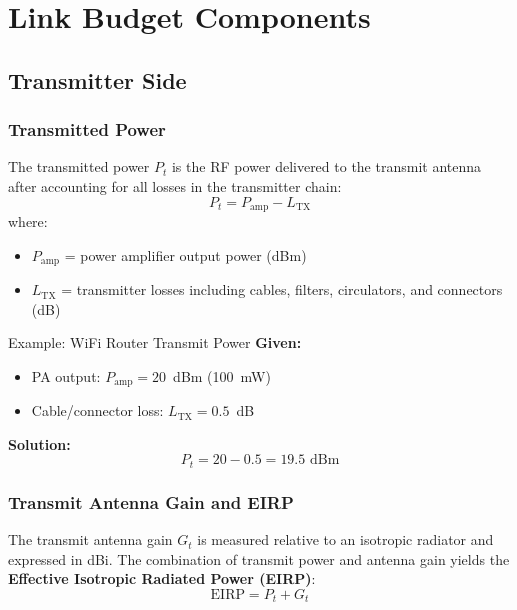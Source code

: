 \section{Link Budget Components}\label{link-budget-components}

\subsection{Transmitter Side}

\subsubsection{Transmitted Power}

The transmitted power $P_t$ is the RF power delivered to the transmit antenna after accounting for all losses in the transmitter chain:
\begin{equation}
P_t = P_{\text{amp}} - L_{\text{TX}}
\label{eq:tx-power}
\end{equation}
where:
\begin{itemize}
\item $P_{\text{amp}}$ = power amplifier output power (dBm)
\item $L_{\text{TX}}$ = transmitter losses including cables, filters, circulators, and connectors (dB)
\end{itemize}

\begin{calloutbox}{Example: WiFi Router Transmit Power}
\textbf{Given:}
\begin{itemize}
\item PA output: $P_{\text{amp}} = 20$~dBm (100~mW)
\item Cable/connector loss: $L_{\text{TX}} = 0.5$~dB
\end{itemize}

\textbf{Solution:}
\begin{equation*}
P_t = 20 - 0.5 = 19.5\text{~dBm}
\end{equation*}
\end{calloutbox}

\subsubsection{Transmit Antenna Gain and EIRP}

The transmit antenna gain $G_t$ is measured relative to an isotropic radiator and expressed in dBi. The combination of transmit power and antenna gain yields the \textbf{Effective Isotropic Radiated Power (EIRP)}:
\begin{equation}
\text{EIRP} = P_t + G_t
\label{eq:eirp}
\end{equation}

